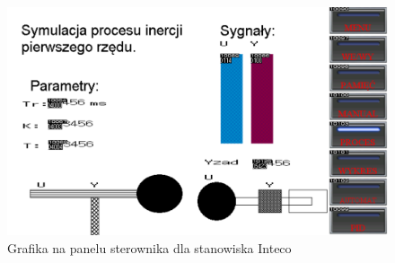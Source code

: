 \documentclass[a4paper,titlepage,11pt,twosides,floatssmall]{mwrep}
\begin{document}
\begin{figure}[]
	\centering
	\includegraphics[scale=0.6]{../intecographics2.pdf}
	\caption{Grafika na panelu sterownika dla stanowiska Inteco}
	\label{zad13_graph}
\end{figure}

\end{document}
